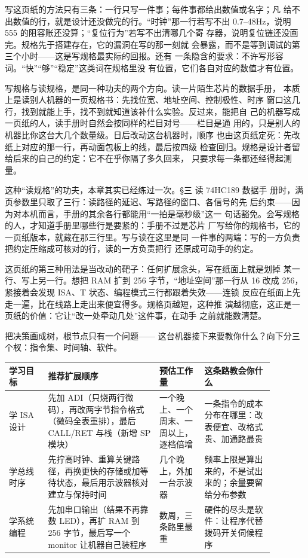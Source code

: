 写这页纸的方法只有三条：一行只写一件事；每件事都给出数值或名字；凡
给不出数值的行，就是设计还没做完的行。“时钟”那一行若写不出
0.7--48Hz，说明 555 的阻容账还没算；“复位行为”若写不出清哪几个寄
存器，说明复位链还没画完。规格先于搭建存在，它的漏洞在写的那一刻就
会暴露，而不是等到调试的第三个小时——这是写规格最实际的回报。还有
一条隐含的要求：不许写形容词。“快”“够”“稳定”这类词在规格里没
有位置，它们各自对应的数值才有位置。

写规格与读规格，是同一种功夫的两个方向。读一片陌生芯片的数据手册，
本质上是读别人机器的一页规格书：先找位宽、地址空间、控制极性、时序
窗口这几行，找到就能上手，找不到就知道该补什么实验。反过来，能把自
己的机器写成一页纸的人，读手册时自然会按同样的栏目对号——栏目是通
用的，只是别人的机器比你这台大几个数量级。日后改动这台机器时，顺序
也由这页纸定死：先改纸上对应的那一行，再动面包板上的线，最后按四级
检查回归。规格是设计者留给后来的自己的约定：它不在乎你隔了多久回来，
只要求每一条都还经得起测量。

这种“读规格”的功夫，本章其实已经练过一次。§三 读 74HC189 数据手
册时，满页参数里只取了三行：读路径的延迟、写路径的窗口、各信号的先
后约束——因为对本机而言，手册的其余各行都能用“一拍是毫秒级”这一
句话豁免。会写规格的人，才知道手册里哪些行是要紧的：手册不过是芯片
厂写给你的规格书，它的一页纸版本，就藏在那三行里。写与读在这里是同
一件事的两端：写的一方负责把约定压缩成可核对的行，读的一方负责把行
还原成可动手的约定。

这页纸的第三种用法是当改动的靶子：任何扩展念头，写在纸面上就是划掉
某一行、写上另一行。想把 RAM 扩到 256 字节，“地址空间”那一行从 16
改成 256，紧接着会发现 ISA、T 状态、编程模式三行都跟着失效——连锁
反应在纸面上先走一遍，比在线路上走出来便宜得多。规格页越短，这种推
演越彻底，这正是一页纸的价值：它让“改一处牵动几处”这件事，在动手
之前就能数清楚。

把决策画成树，根节点只有一个问题——
这台机器接下来要教你什么？向下分三个杈：指令集、时间轴、软件。

\begin{longtable}{L{0.13\linewidth}L{0.37\linewidth}L{0.15\linewidth}L{0.23\linewidth}}
\toprule
学习目标 & 推荐扩展顺序 & 预估工作量 & 这条路教会你什么 \\
\midrule
学 ISA 设计 & 先加 ADI（只烧两行微码），再改两字节指令格式（微码全表重排），最后 CALL/RET 与栈（新增 SP 模块） & 一个晚上、一个周末、一周以上，逐档倍增 & 一条指令的成本分布在哪里：改表便宜、改格式贵、加通路最贵 \\
学总线时序 & 先拧高时钟、重算关键路径，再换更快的存储或加等待状态，最后用示波器核对建立与保持时间 & 几个晚上，外加一台示波器 & 频率上限是算出来的，不是试出来的；余量要留给分布参数 \\
学系统编程 & 先加串口输出（结果不再靠数 LED），再扩 RAM 到 256 字节，最后写一个 monitor 让机器自己装程序 & 数周，三条路里最重 & 硬件的尽头是软件：让程序代替拨码开关伺候程序 \\
\bottomrule
\end{longtable}

